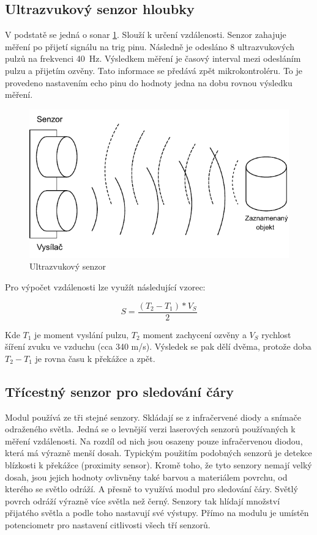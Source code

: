 \subsection*{Ultrazvukový senzor hloubky} \label{theory:ultrasonic}
V podstatě se jedná o sonar \ref{fig:ultrasonic}. Slouží k určení vzdálenosti. Senzor zahajuje měření po přijetí signálu na trig pinu. Následně je odesláno 8 ultrazvukových pulzů na frekvenci 40~Hz. Výsledkem měření je časový interval mezi odesláním pulzu a přijetím ozvěny. Tato informace se předává zpět mikrokontroléru. To je provedeno nastavením echo pinu do hodnoty jedna na dobu rovnou výsledku měření. \cite[str:~93]{embeded_robotics}

\begin{figure}[h!]
	\centering
	\includegraphics[scale=0.75]{obrazky-figures/ultrasonic.pdf}
	\caption{Ultrazvukový senzor}
	\label{fig:ultrasonic}
\end{figure}

Pro výpočet vzdálenosti lze využít následující vzorec:

\begin{equation}
	S = \frac{(T_2 - T_1) * V_S}{2}
\end{equation}

Kde $T_1$ je moment vyslání pulzu, $T_2$ moment zachycení ozvěny a $V_S$ rychlost šíření zvuku ve vzduchu (cca 340 m/s). Výsledek se pak dělí dvěma, protože doba $T_2 - T_1$ je rovna času k překážce a zpět. \cite[str:~132]{mobilní_roboty}

\newpage
\subsection*{Třícestný senzor pro sledování čáry}
Modul používá ze tři stejné senzory. Skládají se z infračervené diody a snímače odraženého světla. Jedná se o levnější verzi laserových senzorů používaných k měření vzdálenosti. Na rozdíl od nich jsou osazeny pouze infračervenou diodou, která má výrazně menší dosah. Typickým použitím podobných senzorů je detekce blízkosti k překážce (proximity sensor). Kromě toho, že tyto senzory nemají velký dosah, jsou jejich hodnoty ovlivněny také barvou a materiálem povrchu, od kterého se světlo odráží. A přesně to využívá modul pro sledování čáry. Světlý povrch odráží výrazně více světla než černý. Senzory tak hlídají množství přijatého světla a podle toho nastavují své výstupy. Přímo na modulu je umístěn potenciometr pro nastavení citlivosti všech tří senzorů. \cite[str:~115, 148]{mobilní_roboty}

